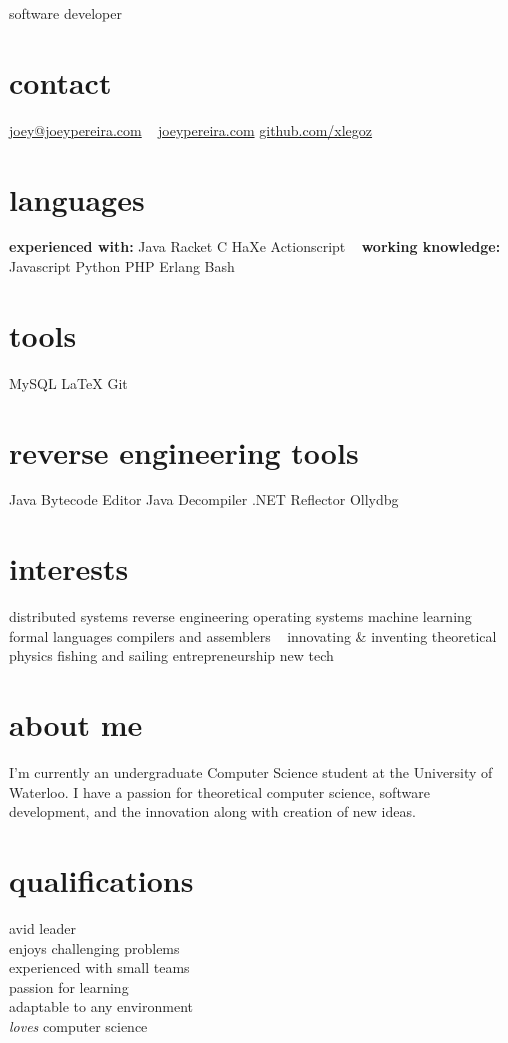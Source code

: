 \documentclass[]{friggeri-cv-short}
\begin{document}
       {software developer}

\begin{aside}
  \section{contact}
    \href{mailto:joey@joeypereira.com}{joey@joeypereira.com}
    ~
    \href{http://joeypereira.com}{joeypereira.com}
    \href{http://www.github.com/xlegoz}{github.com/xlegoz}
  \section{languages}
  \textbf{experienced with:}
  	Java
  	Racket
  	C
  	HaXe
  	Actionscript
	~
	\textbf{working knowledge:}
	Javascript
	Python
  	PHP
	Erlang
	Bash
  \section{tools}
    MySQL
    \LaTeX
	Git
  \section{reverse engineering tools}
  	Java Bytecode Editor
  	Java Decompiler
  	.NET Reflector
  	Ollydbg
  \section{interests}
  	distributed systems
  	reverse engineering
  	operating systems
  	machine learning
  	formal languages
  	compilers and assemblers
  	~
	innovating \& inventing
  	theoretical physics
  	fishing and sailing
  	entrepreneurship
  	new tech
\end{aside}


\section{about me}
I'm currently an undergraduate Computer Science student at the University of Waterloo. I have a passion for theoretical computer science, software development, and the innovation along with creation of new ideas.
\section{qualifications}
\begin{multicols}{3}
 avid leader \\ enjoys challenging problems \\ experienced with small teams \\ passion for learning \\ adaptable to any environment \\ {\em loves} computer science
\end{multicols}
\end{document}
